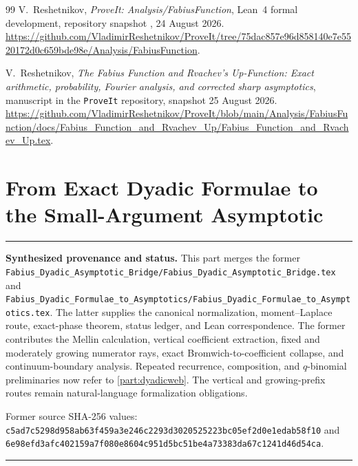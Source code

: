\documentclass[11pt,oneside]{article}
\theoremstyle{definition}
\theoremstyle{remark}
\newenvironment{boxedremark}{%
  \par\smallskip\noindent\begin{center}\begin{minipage}{0.94\textwidth}%
  \color{black}\hrule\vspace{0.6em}\small
}{%
  \vspace{0.6em}\hrule\end{minipage}\end{center}\smallskip
}
\begin{document}
\begin{thebibliography}{99}
V.~Reshetnikov,
\newblock \emph{ProveIt: Analysis/FabiusFunction},
\newblock Lean~4 formal development, repository snapshot
  , 24 August 2026.
\newblock \url{https://github.com/VladimirReshetnikov/ProveIt/tree/75dac857e96d858140e7e5520172d0c659bde98e/Analysis/FabiusFunction}.

V.~Reshetnikov,
\newblock \emph{The Fabius Function and Rvachev's Up-Function: Exact arithmetic,
  probability, Fourier analysis, and corrected sharp asymptotics},
\newblock manuscript in the \texttt{ProveIt} repository, snapshot 25 August 2026.
\newblock \url{https://github.com/VladimirReshetnikov/ProveIt/blob/main/Analysis/FabiusFunction/docs/Fabius_Function_and_Rvachev_Up/Fabius_Function_and_Rvachev_Up.tex}.

\end{thebibliography}


\renewcommand{\arraystretch}{1}

\clearpage
\part{From Exact Dyadic Formulae to the Small-Argument Asymptotic}
\label{part:dyadicasym}
\begin{boxedremark}
\textbf{Synthesized provenance and status.} This part merges the former
\nolinkurl{Fabius_Dyadic_Asymptotic_Bridge/Fabius_Dyadic_Asymptotic_Bridge.tex} and
\nolinkurl{Fabius_Dyadic_Formulae_to_Asymptotics/Fabius_Dyadic_Formulae_to_Asymptotics.tex}.
The latter supplies the canonical normalization, moment--Laplace route, exact-phase theorem,
status ledger, and Lean correspondence.  The former contributes the Mellin calculation,
vertical coefficient extraction, fixed and moderately growing numerator rays, exact
Bromwich-to-coefficient collapse, and continuum-boundary analysis.  Repeated recurrence,
composition, and $q$-binomial preliminaries now refer to \cref{part:dyadicweb}.  The vertical
and growing-prefix routes remain natural-language formalization obligations.\par\smallskip
Former source SHA-256 values:
\nolinkurl{c5ad7c5298d958ab63f459a3e246c2293d3020525223bc05ef2d0e1edab58f10} and
\nolinkurl{6e98efd3afc402159a7f080e8604c951d5bc51be4a73383da67c1241d46d54ca}.
\end{boxedremark}
\end{document}
